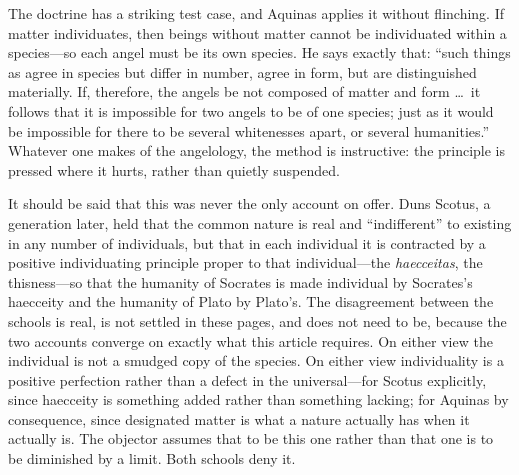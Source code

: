 The doctrine has a striking test case, and Aquinas applies it without flinching. If matter individuates, then beings without matter cannot be individuated within a species---so each angel must be its own species. He says exactly that: ``such things as agree in species but differ in number, agree in form, but are distinguished materially. If, therefore, the angels be not composed of matter and form \ldots\ it follows that it is impossible for two angels to be of one species; just as it would be impossible for there to be several whitenesses apart, or several humanities.'' Whatever one makes of the angelology, the method is instructive: the principle is pressed where it hurts, rather than quietly suspended.

It should be said that this was never the only account on offer. Duns Scotus, a generation later, held that the common nature is real and ``indifferent'' to existing in any number of individuals, but that in each individual it is contracted by a positive individuating principle proper to that individual---the \emph{haecceitas}, the thisness---so that the humanity of Socrates is made individual by Socrates's haecceity and the humanity of Plato by Plato's. The disagreement between the schools is real, is not settled in these pages, and does not need to be, because the two accounts converge on exactly what this article requires. On either view the individual is not a smudged copy of the species. On either view individuality is a positive perfection rather than a defect in the universal---for Scotus explicitly, since haecceity is something added rather than something lacking; for Aquinas by consequence, since designated matter is what a nature actually has when it actually is. The objector assumes that to be this one rather than that one is to be diminished by a limit. Both schools deny it.

